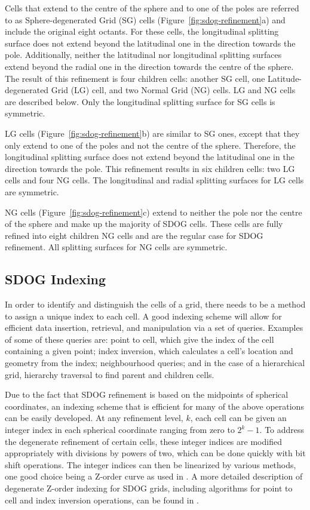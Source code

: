 Cells that extend to the centre of the sphere and to one of the poles are referred to as Sphere-degenerated Grid (SG) cells (Figure~\ref{fig:sdog-refinement}a) and include the original eight octants.
For these cells, the longitudinal splitting surface does not extend beyond the latitudinal one in the direction towards the pole.
Additionally, neither the latitudinal nor longitudinal splitting surfaces extend beyond the radial one in the direction towards the centre of the sphere.
The result of this refinement is four children cells: another SG cell, one Latitude-degenerated Grid (LG) cell, and two Normal Grid (NG) cells.
LG and NG cells are described below.
Only the longitudinal splitting surface for SG cells is symmetric.


LG cells (Figure~\ref{fig:sdog-refinement}b) are similar to SG ones, except that they only extend to one of the poles and not the centre of the sphere.
Therefore, the longitudinal splitting surface does not extend beyond the latitudinal one in the direction towards the pole.
This refinement results in six children cells: two LG cells and four NG cells.
The longitudinal and radial splitting surfaces for LG cells are symmetric.


NG cells (Figure~\ref{fig:sdog-refinement}c) extend to neither the pole nor the centre of the sphere and make up the majority of SDOG cells.
These cells are fully refined into eight children NG cells and are the regular case for SDOG refinement.
All splitting surfaces for NG cells are symmetric.


\subsection{SDOG Indexing} \label{sec:sdog-indexing}
In order to identify and distinguish the cells of a grid, there needs to be a method to assign a unique index to each cell.
A good indexing scheme will allow for efficient data insertion, retrieval, and manipulation via a set of queries.
Examples of some of these queries are: point to cell, which give the index of the cell containing a given point; index inversion, which calculates a cell's location and geometry from the index; neighbourhood queries; and in the case of a hierarchical grid, hierarchy traversal to find parent and children cells.


Due to the fact that SDOG refinement is based on the midpoints of spherical coordinates, an indexing scheme that is efficient for many of the above operations can be easily developed.
At any refinement level, $k$, each cell can be given an integer index in each spherical coordinate ranging from zero to $2^{k} - 1$.
To address the degenerate refinement of certain cells, these integer indices are modified appropriately with divisions by powers of two, which can be done quickly with bit shift operations.
The integer indices can then be linearized by various methods, one good choice being a Z-order curve \cite{morton1966computer} as used in \cite{yu2009sdog}.
A more detailed description of degenerate Z-order indexing for SDOG grids, including algorithms for point to cell and index inversion operations, can be found in \cite{yu2009coding}.


